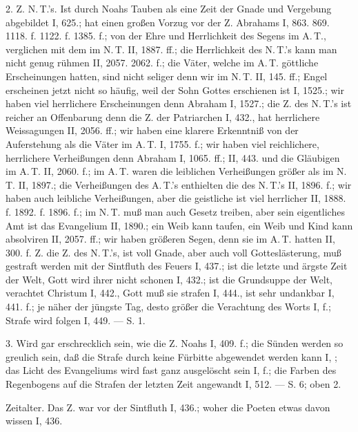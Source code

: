 2.  Z.  N.\,T.’s. Ist durch Noahs Tauben als eine Zeit der Gnade und Vergebung abgebildet I, 625.; hat einen großen Vorzug vor der Z. Abrahams I, 863. 869. 1118. f. 1122. f. 1385. f.; von der Ehre und Herrlichkeit des Segens im A.\,T., verglichen mit dem im N.\,T. II, 1887. ff.; die Herrlichkeit des N.\,T.’s kann man nicht genug rühmen II, 2057. 2062. f.; die Väter, welche im A.\,T. göttliche Erscheinungen hatten, sind nicht seliger denn wir im N.\,T. II, 145. ff.; Engel erscheinen jetzt nicht so häufig, weil der Sohn Gottes erschienen ist I, 1525.; wir haben viel herrlichere Erscheinungen denn Abraham I, 1527.; die Z. des N.\,T.’s ist reicher an Offenbarung denn die Z. der Patriarchen I, 432., hat herrlichere Weissagungen II, 2056. ff.; wir haben eine klarere Erkenntniß von der Auferstehung als die Väter im A.\,T. I, 1755. f.; wir haben viel reichlichere, herrlichere Verheißungen denn Abraham I, 1065. ff.; II, 443. und die Gläubigen im A.\,T. II, 2060. f.; im A.\,T. waren die leiblichen Verheißungen größer als im N.\,T. II, 1897.; die Verheißungen des A.\,T.’s enthielten die des N.\,T.’s II, 1896. f.; wir haben auch leibliche Verheißungen, aber die geistliche ist viel herrlicher II, 1888. f. 1892. f. 1896. f.; im N.\,T. muß man auch Gesetz treiben, aber sein eigentliches Amt ist das Evangelium II, 1890.; ein Weib kann taufen, ein Weib und Kind kann absolviren II, 2057. ff.; wir haben größeren Segen, denn sie im A.\,T. hatten II, 300. f.  Z.  die Z. des N.\,T.’s, ist voll Gnade, aber auch voll Gotteslästerung, muß gestraft werden mit der Sintfluth des Feuers I, 437.; ist die letzte und ärgste Zeit der Welt, Gott wird ihrer nicht schonen I, 432.; ist die Grundsuppe der Welt, verachtet Christum I, 442., Gott muß sie strafen I, 444., ist sehr undankbar I, 441. f.; je näher der jüngste Tag, desto größer die Verachtung des Worts I,  f.; Strafe wird folgen I, 449. — S.  1.

3.  Wird gar erschrecklich sein, wie die Z. Noahs I, 409. f.; die Sünden werden so greulich sein, daß die Strafe durch keine Fürbitte abgewendet werden kann I, ; das Licht des Evangeliums wird fast ganz ausgelöscht sein I,  f.; die Farben des Regenbogens auf die Strafen der letzten Zeit angewandt I, 512. — S.  6; oben 2.

Zeitalter. Das  Z. war vor der Sintfluth I, 436.; woher die Poeten etwas davon wissen I, 436.

